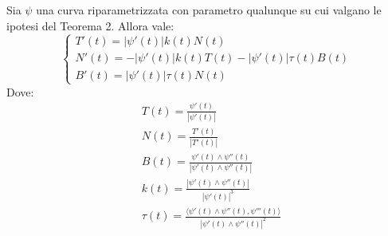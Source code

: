 \begin{theorem}
    Sia $\psi$ una curva riparametrizzata con parametro qualunque su cui valgano le ipotesi del Teorema 2. Allora vale:
    \begin{equation}
        \begin{cases}
            T'(t)=|\psi'(t)| k(t) N(t)\\
            N'(t)=-|\psi'(t)| k(t) T(t) - |\psi'(t)| \tau(t)B(t)\\
            B'(t)=|\psi'(t)|\tau(t)N(t)
        \end{cases}
    \end{equation}
    Dove:
    \begin{align}
        &T(t)=\frac{\psi'(t)}{|\psi'(t)|} \label{Eq: Frenet Tangente}\\
        &N(t)=\frac{T'(t)}{|T'(t)|} \label{Eq: Frenet Normale}\\
        &B(t)=\frac{\psi'(t)\wedge \psi''(t)} {|\psi'(t)\wedge \psi''(t)|} \label{Eq: Frenet Binormale}\\
        &k(t)=\frac{|\psi'(t)\wedge\psi''(t)|}{|\psi'(t)|^3} \label{Eq: Frenet Curvatura}\\
        &\tau(t)=\frac{\langle\psi'(t)\wedge \psi''(t), \psi'''(t)\rangle}{|\psi'(t)\wedge \psi''(t)|^2} \label{Eq: Frenet Torsione}
    \end{align}    
\end{theorem}
